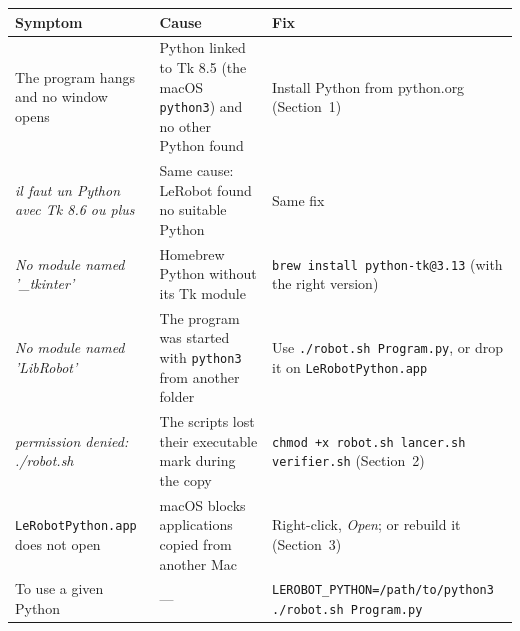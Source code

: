 \documentclass[11pt,a4paper]{article}
\newcommand{\kbd}[1]{\texttt{#1}}
\begin{document}
\begin{tabularx}{\textwidth}{@{}LLL@{}}
\toprule
\textbf{Symptom} & \textbf{Cause} & \textbf{Fix} \\
\midrule
The program hangs and no window opens & Python linked to Tk 8.5 (the macOS \kbd{python3}) and no other Python found & Install Python from python.org (Section~1) \\
\addlinespace
\emph{il faut un Python avec Tk 8.6 ou plus} & Same cause: LeRobot found no suitable Python & Same fix \\
\addlinespace
\emph{No module named '\_tkinter'} & Homebrew Python without its Tk module & \kbd{brew install python-tk@3.13} (with the right version) \\
\addlinespace
\emph{No module named 'LibRobot'} & The program was started with \kbd{python3} from another folder & Use \kbd{./robot.sh Program.py}, or drop it on \kbd{LeRobotPython.app} \\
\addlinespace
\emph{permission denied: ./robot.sh} & The scripts lost their executable mark during the copy & \kbd{chmod +x robot.sh lancer.sh verifier.sh} (Section~2) \\
\addlinespace
\kbd{LeRobotPython.app} does not open & macOS blocks applications copied from another Mac & Right-click, \emph{Open}; or rebuild it (Section~3) \\
\addlinespace
To use a given Python & --- & \kbd{LEROBOT\_PYTHON=\allowbreak /path/\allowbreak to/\allowbreak python3 \allowbreak ./robot.sh Program.py} \\
\bottomrule
\end{tabularx}
\end{document}
